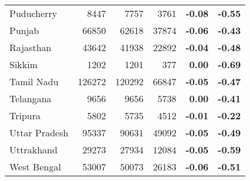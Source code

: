 \begin{table}
\begin{tabular}[t]{lrrr>{\bfseries}r>{\bfseries}r}
Puducherry & 8447 & 7757 & 3761 & -0.08 & -0.55\\
\addlinespace
Punjab & 66850 & 62618 & 37874 & -0.06 & -0.43\\
Rajasthan & 43642 & 41938 & 22892 & -0.04 & -0.48\\
Sikkim & 1202 & 1201 & 377 & 0.00 & -0.69\\
Tamil Nadu & 126272 & 120292 & 66847 & -0.05 & -0.47\\
Telangana & 9656 & 9656 & 5738 & 0.00 & -0.41\\
\addlinespace
Tripura & 5802 & 5735 & 4512 & -0.01 & -0.22\\
Uttar Pradesh & 95337 & 90631 & 49092 & -0.05 & -0.49\\
Uttrakhand & 29273 & 27934 & 12084 & -0.05 & -0.59\\
West Bengal & 53007 & 50073 & 26183 & -0.06 & -0.51\\
\bottomrule
\end{tabular}
\end{table}
